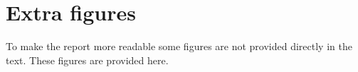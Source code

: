 \chapter*{Extra figures}
\label{ch:extra_figures}

To make the report more readable some figures are not provided directly in the text.
These figures are provided here.


